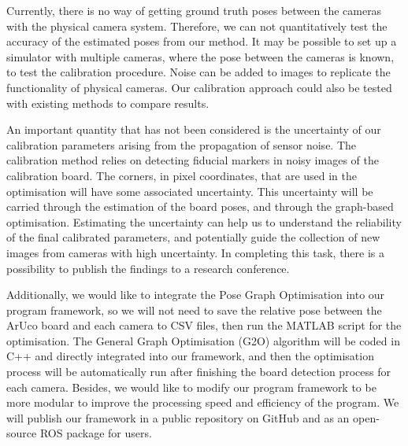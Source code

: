 Currently, there is no way of getting ground truth poses between the cameras with the physical camera system. Therefore, we can not quantitatively test the accuracy of the estimated poses from our method. It may be possible to set up a simulator with multiple cameras, where the pose between the cameras is known, to test the calibration procedure. Noise can be added to images to replicate the functionality of physical cameras. Our calibration approach could also be tested with existing methods to compare results.

An important quantity that has not been considered is the uncertainty of our calibration parameters arising from the propagation of sensor noise. The calibration method relies on detecting fiducial markers in noisy images of the calibration board. The corners, in pixel coordinates, that are used in the optimisation will have some associated uncertainty. This uncertainty will be carried through the estimation of the board poses, and through the graph-based optimisation. Estimating the uncertainty can help us to understand the reliability of the final calibrated parameters, and potentially guide the collection of new images from cameras with high uncertainty. In completing this task, there is a possibility to publish the findings to a research conference.

Additionally, we would like to integrate the Pose Graph Optimisation into our program framework, so we will not need to save the relative pose between the ArUco board and each camera to CSV files, then run the MATLAB script for the optimisation. The General Graph Optimisation (G2O) algorithm will be coded in C++ and directly integrated into our framework, and then the optimisation process will be automatically run after finishing the board detection process for each camera. Besides, we would like to modify our program framework to be more modular to improve the processing speed and efficiency of the program. We will publish our framework in a public repository on GitHub and as an open-source ROS package for users.